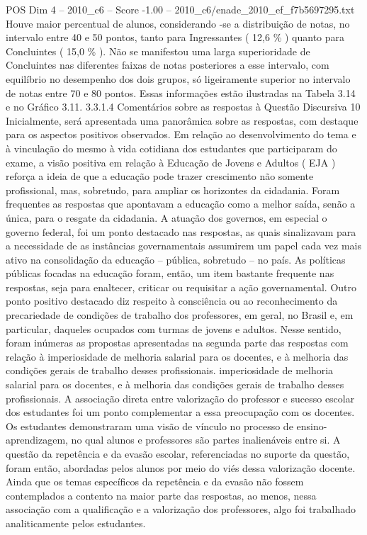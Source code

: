 \begin{textsample}{POS Dim 4 – 2010\_c6 – Score -1.00 – 2010\_c6/enade\_2010\_ef\_f7b5697295.txt}
Houve maior percentual de alunos, considerando -se a distribuição de notas, no intervalo entre 40 e 50 pontos, tanto para Ingressantes ( 12,6 \% ) quanto para Concluintes ( 15,0 \% ).
Não se manifestou uma larga superioridade de Concluintes nas diferentes faixas de notas posteriores a esse intervalo, com equilíbrio no desempenho dos dois grupos, só ligeiramente superior no intervalo de notas entre 70 e 80 pontos.
Essas informações estão ilustradas na Tabela 3.14 e no Gráfico 3.11. 3.3.1.4 Comentários sobre as respostas à Questão Discursiva 10 Inicialmente, será apresentada uma panorâmica sobre as respostas, com destaque para os aspectos positivos observados.
Em relação ao desenvolvimento do tema e à vinculação do mesmo à vida cotidiana dos estudantes que participaram do exame, a visão positiva em relação à Educação de Jovens e Adultos ( EJA ) reforça a ideia de que a educação pode trazer crescimento não somente profissional, mas, sobretudo, para ampliar os horizontes da cidadania.
Foram frequentes as respostas que apontavam a educação como a melhor saída, senão a única, para o resgate da cidadania.
A atuação dos governos, em especial o governo federal, foi um ponto destacado nas respostas, as quais sinalizavam para a necessidade de as instâncias governamentais assumirem um papel cada vez mais ativo na consolidação da educação – pública, sobretudo – no país.
As políticas públicas focadas na educação foram, então, um item bastante frequente nas respostas, seja para enaltecer, criticar ou requisitar a ação governamental.
Outro ponto positivo destacado diz respeito à consciência ou ao reconhecimento da precariedade de condições de trabalho dos professores, em geral, no Brasil e, em particular, daqueles ocupados com turmas de jovens e adultos.
Nesse sentido, foram inúmeras as propostas apresentadas na segunda parte das respostas com relação à imperiosidade de melhoria salarial para os docentes, e à melhoria das condições gerais de trabalho desses profissionais. imperiosidade de melhoria salarial para os docentes, e à melhoria das condições gerais de trabalho desses profissionais.
A associação direta entre valorização do professor e sucesso escolar dos estudantes foi um ponto complementar a essa preocupação com os docentes.
Os estudantes demonstraram uma visão de vínculo no processo de ensino-aprendizagem, no qual alunos e professores são partes inalienáveis entre si.
A questão da repetência e da evasão escolar, referenciadas no suporte da questão, foram então, abordadas pelos alunos por meio do viés dessa valorização docente.
Ainda que os temas específicos da repetência e da evasão não fossem contemplados a contento na maior parte das respostas, ao menos, nessa associação com a qualificação e a valorização dos professores, algo foi trabalhado analiticamente pelos estudantes.

\end{textsample}
